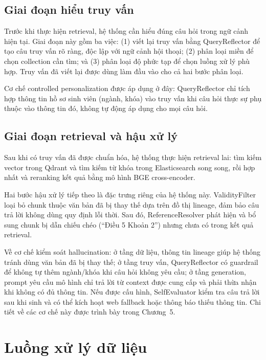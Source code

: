 \documentclass[../DoAn.tex]{subfiles}
\begin{document}
\subsection{Giai đoạn hiểu truy vấn}

Trước khi thực hiện retrieval, hệ thống cần hiểu đúng câu hỏi trong ngữ cảnh
hiện tại. Giai đoạn này gồm ba việc: (1) viết lại truy vấn bằng QueryReflector
để tạo câu truy vấn rõ ràng, độc lập với ngữ cảnh hội thoại; (2) phân loại miền
để chọn collection cần tìm; và (3) phân loại độ phức tạp để chọn luồng xử lý phù
hợp. Truy vấn đã viết lại được dùng làm đầu vào cho cả hai bước phân loại.

Cơ chế controlled personalization được áp dụng ở đây: QueryReflector chỉ tích
hợp thông tin hồ sơ sinh viên (ngành, khóa) vào truy vấn khi câu hỏi thực sự
phụ thuộc vào thông tin đó, không tự động áp dụng cho mọi câu hỏi.

\subsection{Giai đoạn retrieval và hậu xử lý}

Sau khi có truy vấn đã được chuẩn hóa, hệ thống thực hiện retrieval lai: tìm
kiếm vector trong Qdrant và tìm kiếm từ khóa trong Elasticsearch song song,
rồi hợp nhất và reranking kết quả bằng mô hình BGE cross-encoder.

Hai bước hậu xử lý tiếp theo là đặc trưng riêng của hệ thống này. ValidityFilter
loại bỏ chunk thuộc văn bản đã bị thay thế dựa trên đồ thị lineage, đảm bảo
câu trả lời không dùng quy định lỗi thời. Sau đó, ReferenceResolver phát hiện
và bổ sung chunk bị dẫn chiếu chéo (``Điều 5 Khoản 2'') nhưng chưa có trong
kết quả retrieval.

Về cơ chế kiểm soát hallucination: ở tầng dữ liệu, thông tin lineage giúp hệ
thống tránh dùng văn bản đã bị thay thế; ở tầng truy vấn, QueryReflector có
guardrail để không tự thêm ngành/khóa khi câu hỏi không yêu cầu; ở tầng
generation, prompt yêu cầu mô hình chỉ trả lời từ context được cung cấp và phải
thừa nhận khi không có đủ thông tin. Nếu được cấu hình, SelfEvaluator kiểm tra
câu trả lời sau khi sinh và có thể kích hoạt web fallback hoặc thông báo thiếu
thông tin. Chi tiết về các cơ chế này được trình bày trong Chương~5.

\section{Luồng xử lý dữ liệu}
\end{document}
